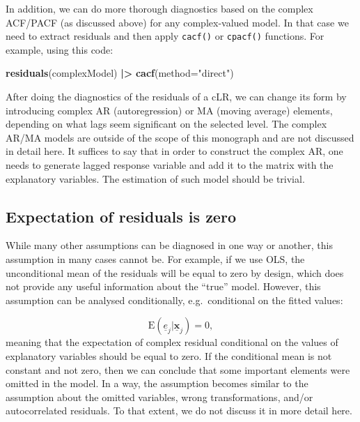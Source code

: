 \documentclass[
]{book}
\newenvironment{Shaded}{\begin{snugshade}}{\end{snugshade}}
\newcommand{\DataTypeTok}[1]{\textcolor[rgb]{0.13,0.29,0.53}{#1}}
\newcommand{\ErrorTok}[1]{\textcolor[rgb]{0.64,0.00,0.00}{\textbf{#1}}}
\newcommand{\KeywordTok}[1]{\textcolor[rgb]{0.13,0.29,0.53}{\textbf{#1}}}
\newcommand{\NormalTok}[1]{#1}
\newcommand{\OperatorTok}[1]{\textcolor[rgb]{0.81,0.36,0.00}{\textbf{#1}}}
\newcommand{\StringTok}[1]{\textcolor[rgb]{0.31,0.60,0.02}{#1}}
\begin{document}
In addition, we can do more thorough diagnostics based on the complex ACF/PACF (as discussed above) for any complex-valued model. In that case we need to extract residuals and then apply \texttt{cacf()} or \texttt{cpacf()} functions. For example, using this code:

\begin{Shaded}
\begin{Highlighting}[]
\KeywordTok{residuals}\NormalTok{(complexModel) }\OperatorTok{|}\ErrorTok{\textgreater{}}
\StringTok{    }\KeywordTok{cacf}\NormalTok{(}\DataTypeTok{method=}\StringTok{"direct"}\NormalTok{)}
\end{Highlighting}
\end{Shaded}

After doing the diagnostics of the residuals of a cLR, we can change its form by introducing complex AR (autoregression) or MA (moving average) elements, depending on what lags seem significant on the selected level. The complex AR/MA models are outside of the scope of this monograph and are not discussed in detail here. It suffices to say that in order to construct the complex AR, one needs to generate lagged response variable and add it to the matrix with the explanatory variables. The estimation of such model should be trivial.

\hypertarget{expectation-of-residuals-is-zero}{%
\subsection{Expectation of residuals is zero}\label{expectation-of-residuals-is-zero}}

While many other assumptions can be diagnosed in one way or another, this assumption in many cases cannot be. For example, if we use OLS, the unconditional mean of the residuals will be equal to zero by design, which does not provide any useful information about the ``true'' model. However, this assumption can be analysed conditionally, e.g.~conditional on the fitted values:

\begin{equation}
    \mathrm{E}(\underline{e}_j | \underline{\mathbf{x}}_j)=0 ,
    \label{eq:residsExpectation}
\end{equation}
meaning that the expectation of complex residual conditional on the values of explanatory variables should be equal to zero. If the conditional mean is not constant and not zero, then we can conclude that some important elements were omitted in the model. In a way, the assumption becomes similar to the assumption about the omitted variables, wrong transformations, and/or autocorrelated residuals. To that extent, we do not discuss it in more detail here.
\end{document}
